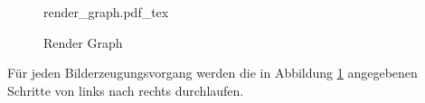 \begin{figure}[H]
    \begin{tcolorbox}
    \centering
    \def\svgwidth{\columnwidth}
    {render_graph.pdf_tex}
    \end{tcolorbox}
    \caption{Render Graph}
    \label{pic:Render Graph}
\end{figure}

Für jeden Bilderzeugungsvorgang werden die in Abbildung \ref{pic:Render Graph} angegebenen Schritte von links nach rechts 
durchlaufen.